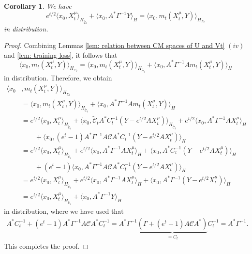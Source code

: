 \documentclass[10pt]{article} %
\theoremstyle{plain}
\newtheorem{corollary}[theorem]{Corollary}
\theoremstyle{definition}
\theoremstyle{remark}
\newcommand{\C}{\mathcal C}
\begin{document}
\begin{corollary}
\label{cor:ID1}
We have
    \begin{equation}\label{eq:ID1}
        e^{t/2} \langle x_0, X_t^\mu \rangle_{H_{\widetilde{\C}_t}} + \langle x_0, A^* \Gamma^{-1}Y \rangle_H = \langle x_0, m_t(X_t^\mu,Y) \rangle_{H_{\Sigma_t}}
    \end{equation}
in distribution.
\end{corollary}
\begin{proof}
    Combining Lemmas \ref{lem: relation between CM spaces of U and Vt} $(iv)$ and \ref{lem: training loss}, it follows that
\begin{equation*}
    \langle x_0 , m_t(X_t^\mu, Y) \rangle_{H_{\Sigma_t}}
    =  \langle x_0, m_t(X_t^\mu, Y) \rangle_{H_{\widetilde{\C}_t}} + \langle x_0, A^*\Gamma^{-1}A m_t(X_t^\mu, Y) \rangle_H
\end{equation*}
in distribution. Therefore, we obtain
\begin{align*} 
    \langle x_0 &, m_t(X_t^\mu, Y) \rangle_{H_{\Sigma_t}} \\
    &=  \langle x_0, m_t(X_t^\mu, Y) \rangle_{H_{\widetilde{\C}_t}} + \langle x_0, A^*\Gamma^{-1}A m_t(X_t^\mu, Y) \rangle_H  \\
    & = {e^{t/2}} \langle x_0, X_t^\mu \rangle_{H_{\widetilde{\C}_t}} +  \langle x_0 , \widetilde{\C}_t A^*C_t^{-1}(Y-e^{t/2}AX_t^\mu) \rangle_{H_{\widetilde{\C}_t}} + e^{t/2} \langle x_0, A^*\Gamma^{-1}AX_t^\mu \rangle_{H} \\
    & \quad\quad + \langle x_0, (e^t-1) A^*\Gamma^{-1}A \C A^* C_t^{-1} (Y-e^{t/2}AX_t^\mu) \rangle_H\\
    &= e^{t/2} \langle x_0, X_t^\mu \rangle_{H_{\widetilde{\C}_t}} +  e^{t/2} \langle x_0, A^*\Gamma^{-1}AX_t^\mu \rangle_{H} + \langle x_0, A^*C_t^{-1}(Y-e^{t/2}AX_t^\mu) \rangle_H \\
    & \quad\quad + (e^t-1) \langle x_0, A^*\Gamma^{-1}A \C A^* C_t^{-1} (Y-e^{t/2}AX_t^\mu) \rangle_H\\
    &= e^{t/2} \langle x_0, X_t^\mu \rangle_{H_{\widetilde{\C}_t}} +  e^{t/2} \langle x_0, A^*\Gamma^{-1}AX_t^\mu \rangle_{H} 
    + \langle x_0, A^* \Gamma^{-1} (Y-e^{t/2}X_t^\mu)\rangle_H \\
    & = e^{t/2} \langle x_0, X_t^\mu \rangle_{H_{\widetilde{\C}_t}} + \langle x_0,  A^*\Gamma^{-1 }Y  \rangle_H
\end{align*}
in distribution, where we have used that
\begin{eqnarray*}
    A^*C_t^{-1} + (e^t-1) A^*\Gamma^{-1}A \C A^* C_t^{-1} = A^*  \Gamma^{-1}\underbrace{\left(\Gamma + (e^t-1) A\C A^* \right)}_{=C_t}C_t^{-1} = A^*\Gamma^{-1}.
\end{eqnarray*}
This completes the proof.
\end{proof}
\end{document}
